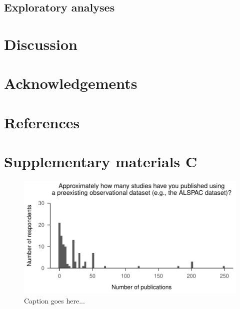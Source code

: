 \documentclass[
  man,floatsintext]{apa6}
\newlength{\cslhangindent}
\newlength{\cslentryspacingunit} %
\newenvironment{CSLReferences}[2] %
 {%
  \setlength{\parindent}{0pt}
  \ifodd #1
  \let\oldpar\par
  \def\par{\hangindent=\cslhangindent\oldpar}
  \fi
  \setlength{\parskip}{#2\cslentryspacingunit}
 }%
 {}
\begin{document}
\hypertarget{exploratory-analyses}{%
\subsection{Exploratory analyses}\label{exploratory-analyses}}

\hypertarget{discussion}{%
\section{Discussion}\label{discussion}}

\hypertarget{acknowledgements}{%
\section{Acknowledgements}\label{acknowledgements}}

\newpage

\hypertarget{references}{%
\section{References}\label{references}}

\hypertarget{refs}{}
\begin{CSLReferences}{0}{0}
\end{CSLReferences}

\newpage

\hypertarget{appendix-appendix}{%
\appendix}


\hypertarget{supplementary-materials-c}{%
\section{Supplementary materials C}\label{supplementary-materials-c}}

\begin{figure}

{\centering \includegraphics[width=1\linewidth]{manuscript_files/figure-latex/numStudies-1} 

}

\caption{Caption goes here...}\label{fig:numStudies}
\end{figure}
\end{document}
